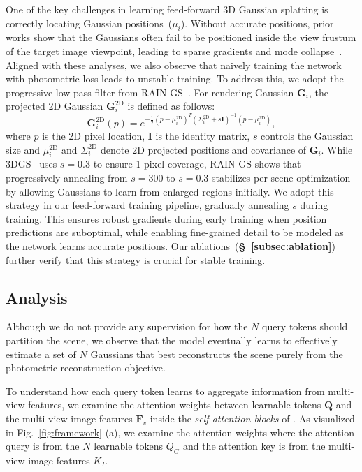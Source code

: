 One of the key challenges in learning feed-forward 3D Gaussian splatting is correctly locating Gaussian positions~($\mu_i$). Without accurate positions, prior works show that the Gaussians often fail to be positioned inside the view frustum of the target image viewpoint, leading to sparse gradients and mode collapse~\cite{charatan2024pixelsplat, hong2024pf3plat}. Aligned with these analyses, we also observe that naively training the network with photometric loss leads to unstable training. To address this, we adopt the progressive low-pass filter from RAIN-GS~\cite{jung2024relaxing}. For rendering Gaussian $\mathbf{G}_i$, the projected 2D Gaussian $\mathbf{G}^\text{2D}_i$ is defined as follows:
\begin{equation}
   \mathbf{G}^\text{2D}_{i}(p) = e^{-\frac{1}{2}(p-\mu_{i}^\text{2D})^T(\Sigma_{i}^\text{2D}+s\mathbf{I})^{-1}(p-\mu_{i}^\text{2D})},
\end{equation}
where $p$ is the 2D pixel location, $\mathbf{I}$ is the identity matrix, $s$ controls the Gaussian size and $\mu_i^\text{2D}$ and $\Sigma_i^\text{2D}$ denote 2D projected positions and covariance of $\mathbf{G}_i$. While 3DGS~\cite{kerbl20233d} uses $s=0.3$ to ensure 1-pixel coverage, RAIN-GS shows that progressively annealing from $s=300$ to $s=0.3$ stabilizes per-scene optimization by allowing Gaussians to learn from enlarged regions initially. We adopt this strategy in our feed-forward training pipeline, gradually annealing $s$ during training. This ensures robust gradients during early training when position predictions are suboptimal, while enabling fine-grained detail to be modeled as the network learns accurate positions. Our ablations~(\textbf{\S~\ref{subsec:ablation}}) further verify that this strategy is crucial for stable training.

\subsection{Analysis}
\label{subsec:analysis}
Although we do not provide any supervision for how the $N$ query tokens should partition the scene, we observe that the model eventually learns to effectively estimate a set of $N$ Gaussians that best reconstructs the scene purely from the photometric reconstruction objective. 

To understand how each query token learns to aggregate information from multi-view features, we examine the attention weights between learnable tokens $\mathbf{Q}$ and the multi-view image features $\mathbf{F}_v$ inside the \textit{self-attention blocks} of \mbox{\ours}. As visualized in Fig.~\ref{fig:framework}-(a), we examine the attention weights where the attention query is from the $N$ learnable tokens $Q_G$ and the attention key is from the multi-view image features $K_I$. 

